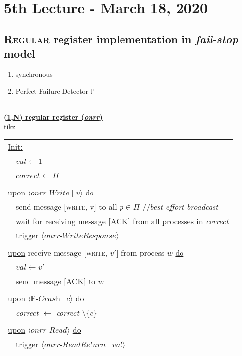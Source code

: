 \documentclass{article}
\begin{document}
	\newpage
	
	\section{5th Lecture - March 18, 2020}
	\begin{adjustwidth}{2em}{2em}
		\subsection{\textsc{Regular} register implementation in \textit{fail-stop} model}
		\begin{adjustwidth}{2em}{2em}
			\begin{enumerate}[-]
				\item synchronous
				\item Perfect Failure Detector $\mathbb{P}$
			\end{enumerate} 
			\hfill \\
			\underline{\textbf{(1,N) regular register (\textit{onrr})}} \\
			tikz \\
			\begin{tabular}{l}
				\underline{Init:} \\
				\ \ $val \leftarrow 1$ \\
				\ \ $correct \leftarrow \Pi$ \\
				\\
				\underline{upon} $\langle \textit{onrr-Write} \mid v \rangle$ \underline{do} \\
				\ \ send message [\textsc{write}, v] to all $p \in \Pi$ //\textit{best-effort broadcast} \\
				\ \ \underline{wait for} receiving message [\textsc{ACK}] from all processes in \textit{correct} \\
				\ \ \underline{trigger} $\langle \textit{onrr-WriteResponse} \rangle$ \\
				\\
				\underline{upon} receive message [\textsc{write}, $v'$] from process $w$ \underline{do} \\
				\ \ $val \leftarrow v'$ \\
				\ \ send message [\textsc{ACK}] to $w$ \\
				\\
				\underline{upon} $\langle \mathbb{P}\textit{-Crash} \mid c \rangle$ \underline{do} \\
				\ \ \textit{correct} $\leftarrow$ \textit{correct $\setminus \{ c \}$ } \\
				\\
				\underline{upon} $\langle \textit{onrr-Read} \rangle$ \underline{do} \\
				\ \ \underline{trigger} $\langle \textit{onrr-ReadReturn} \mid \textit{val} \rangle$
			\end{tabular}
		\end{adjustwidth}
		\newpage

\end{adjustwidth}
\end{document}
